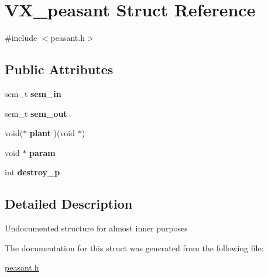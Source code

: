 \hypertarget{structVX__peasant}{\section{V\-X\-\_\-peasant Struct Reference}
\label{structVX__peasant}
}


{\ttfamily \#include $<$peasant.\-h$>$}

\subsection*{Public Attributes}
\begin{DoxyCompactItemize}
\item 
\hypertarget{structVX__peasant_abe7f4e0788012a0edaa319bfd094d964}{sem\-\_\-t {\bfseries sem\-\_\-in}}\label{structVX__peasant_abe7f4e0788012a0edaa319bfd094d964}

\item 
\hypertarget{structVX__peasant_a828cfe2e2b411b1b565fd22f1322706d}{sem\-\_\-t {\bfseries sem\-\_\-out}}\label{structVX__peasant_a828cfe2e2b411b1b565fd22f1322706d}

\item 
\hypertarget{structVX__peasant_a28bc5fe2215e44cc3b2ffff091137504}{void($\ast$ {\bfseries plant} )(void $\ast$)}\label{structVX__peasant_a28bc5fe2215e44cc3b2ffff091137504}

\item 
\hypertarget{structVX__peasant_a552f3b3e713a468266dc743f4cbd2dbf}{void $\ast$ {\bfseries param}}\label{structVX__peasant_a552f3b3e713a468266dc743f4cbd2dbf}

\item 
\hypertarget{structVX__peasant_a1bb877d6f3e0dafad24a1a2f84c173b2}{int {\bfseries destroy\-\_\-p}}\label{structVX__peasant_a1bb877d6f3e0dafad24a1a2f84c173b2}

\end{DoxyCompactItemize}


\subsection{Detailed Description}
Undocumented structure for almost inner purposes 

The documentation for this struct was generated from the following file\-:\begin{DoxyCompactItemize}
\item 
\hyperlink{peasant_8h}{peasant.\-h}\end{DoxyCompactItemize}
